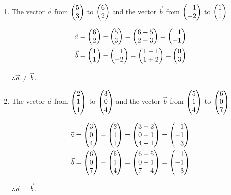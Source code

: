 \documentclass[12pt]{article}
\newenvironment{abc}{\begin{enumerate}[label={\bf(\alph*)}]}{\end{enumerate}}
\newcommand\m[2][]{
	\ifthenelse{\equal {#1} {}}
		{\begin{pmatrix*}[r]#2\end{pmatrix*}}
		{\left(\begin{array}{#1}#2\end{array}\right)}
}
\begin{document}
\begin{abc}
\item{
	The vector $\vec{a}$ from $ \m{5 \\ 3} $ to $ \m{ 6 \\ 2} $ and the vector $\vec{b}$ from $ \m{1 \\ -2} $ to $ \m{ 1 \\ 1} $

	\begin{equation*}
	\begin{aligned}
		\vec{a} &= \m{6 \\ 2} - \m{5 \\ 3} = \m{6 - 5 \\ 2 - 3} = \m{1 \\ -1} \\
		\vec{b} &= \m{1 \\ 1} - \m{1 \\ -2} = \m{1 - 1 \\ 1 + 2} = \m{0 \\ 3} \\
	\end{aligned}
	\end{equation*}

	$ \therefore \vec{a} \neq \vec{b} $.
}
\item{
	The vector $\vec{a}$ from $ \m{2 \\ 1 \\ 1} $ to $ \m{3 \\ 0 \\ 4} $ and the vector $\vec{b}$ from $ \m{5 \\ 1 \\ 4} $ to $ \m{6 \\ 0 \\ 7} $

	\begin{equation*}
	\begin{aligned}
		\vec{a} &= \m{3 \\ 0 \\ 4} - \m{2 \\ 1 \\ 1} = \m{3 - 2 \\ 0 - 1 \\ 4 - 1} = \m{1 \\ -1 \\ 3} \\
		\vec{b} &= \m{6 \\ 0 \\ 7} - \m{5 \\ 1 \\ 4} = \m{6 - 5 \\ 0 - 1 \\ 7 - 4} = \m{1 \\ -1 \\ 3} \\
	\end{aligned}
	\end{equation*}

	$ \therefore \vec{a} = \vec{b} $.
}
\end{abc}
\end{document}
